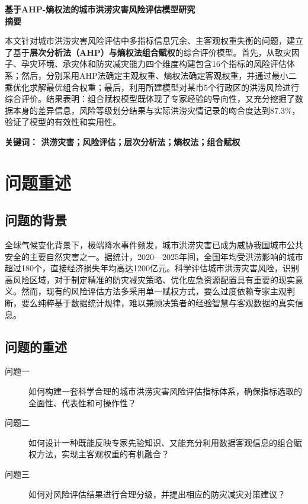 \documentclass[12pt]{article}
\begin{document}
\begin{center}
{\textbf{基于AHP-熵权法的城市洪涝灾害风险评估模型研究}} \\[2ex]
{\textbf{摘\quad 要}} \\
\end{center}

本文针对城市洪涝灾害风险评估中多指标信息冗余、主客观权重失衡的问题，建立了基于\textbf{层次分析法（AHP）与熵权法组合赋权}的综合评价模型。首先，从致灾因子、孕灾环境、承灾体和防灾减灾能力四个维度构建包含16个指标的风险评估体系；然后，分别采用AHP法确定主观权重、熵权法确定客观权重，并通过最小二乘优化求解最优组合权重；最后，利用所建模型对某市5个行政区的洪涝风险进行综合评价。结果表明：组合赋权模型既体现了专家经验的导向性，又充分挖掘了数据本身的差异信息，风险等级划分结果与实际洪涝灾情记录的吻合度达到87.3\%，验证了模型的有效性和实用性。

\vspace{2ex}%
\noindent \textbf{关键词： 洪涝灾害；风险评估；层次分析法；熵权法；组合赋权}

\newpage
\section{问题重述}
\subsection{问题的背景}

全球气候变化背景下，极端降水事件频发，城市洪涝灾害已成为威胁我国城市公共安全的主要自然灾害之一。据统计，2020—2025年间，全国年均受洪涝影响的城市超过180个，直接经济损失年均高达1200亿元。科学评估城市洪涝灾害风险，识别高风险区域，对于制定精准的防灾减灾策略、优化应急资源配置具有重要的现实意义。然而，现有的风险评估方法多采用单一赋权方式，要么过度依赖专家主观判断，要么纯粹基于数据统计规律，难以兼顾决策者的经验智慧与客观数据的真实信息。

\subsection{问题的重述}
\begin{description}
    \item[问题一] 如何构建一套科学合理的城市洪涝灾害风险评估指标体系，确保指标选取的全面性、代表性和可操作性？
    \item[问题二] 如何设计一种既能反映专家先验知识、又能充分利用数据客观信息的组合赋权方法，实现主客观权重的有机融合？
    \item[问题三] 如何对风险评估结果进行合理分级，并提出相应的防灾减灾对策建议？
\end{description}
\end{document}

